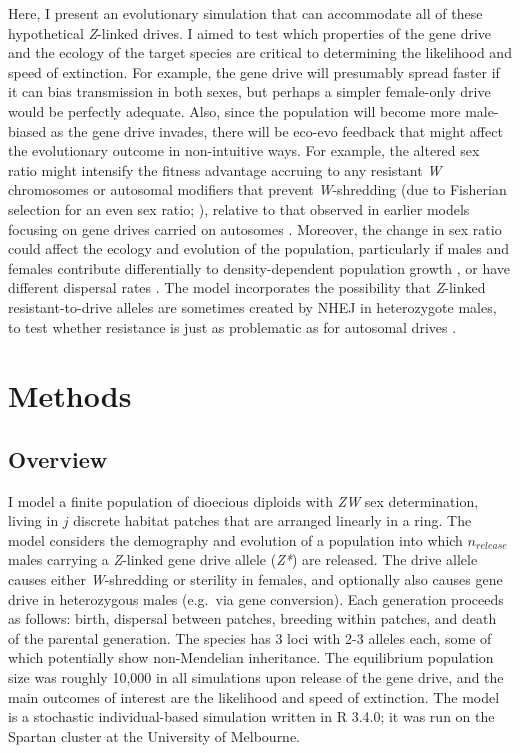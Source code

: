 \documentclass[]{rsos}%
\begin{document}
Here, I present an evolutionary simulation that can accommodate all of
these hypothetical \emph{Z}-linked drives. I aimed to test which
properties of the gene drive and the ecology of the target species are
critical to determining the likelihood and speed of extinction. For
example, the gene drive will presumably spread faster if it can bias
transmission in both sexes, but perhaps a simpler female-only drive
would be perfectly adequate. Also, since the population will become more
male-biased as the gene drive invades, there will be eco-evo feedback
that might affect the evolutionary outcome in non-intuitive ways. For
example, the altered sex ratio might intensify the fitness advantage
accruing to any resistant \emph{W} chromosomes or autosomal modifiers
that prevent \emph{W}-shredding (due to Fisherian selection for an even
sex ratio; \citep{holman2015co}), relative to that observed in earlier
models focusing on gene drives carried on autosomes
\citep{unckless2017ev, drury2017cr}. Moreover, the change in sex ratio
could affect the ecology and evolution of the population, particularly
if males and females contribute differentially to density-dependent
population growth \citep{rankin2007ma, li2019int}, or have different
dispersal rates \citep{li2019sex}. The model incorporates the
possibility that \emph{Z}-linked resistant-to-drive alleles are
sometimes created by NHEJ in heterozygote males, to test whether
resistance is just as problematic as for autosomal drives
\citep{gantz2015mu, gantz2015hi, hammond2016cr, wang2016cr, unckless2017ev}.

\hypertarget{methods}{%
\section{Methods}\label{methods}}

\hypertarget{overview}{%
\subsection{Overview}\label{overview}}

I model a finite population of dioecious diploids with \emph{ZW} sex
determination, living in \(j\) discrete habitat patches that are
arranged linearly in a ring. The model considers the demography and
evolution of a population into which \(n_{release}\) males carrying a
\emph{Z}-linked gene drive allele (\emph{Z*}) are released. The drive
allele causes either \emph{W}-shredding or sterility in females, and
optionally also causes gene drive in heterozygous males (e.g.~via gene
conversion). Each generation proceeds as follows: birth, dispersal
between patches, breeding within patches, and death of the parental
generation. The species has 3 loci with 2-3 alleles each, some of which
potentially show non-Mendelian inheritance. The equilibrium population
size was roughly 10,000 in all simulations upon release of the gene
drive, and the main outcomes of interest are the likelihood and speed of
extinction. The model is a stochastic individual-based simulation
written in R 3.4.0; it was run on the Spartan cluster at the University
of Melbourne.
\end{document}
